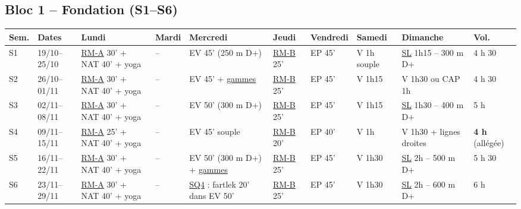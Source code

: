 \documentclass[10pt,a4paper]{article}
\newcommand{\rma}{\hyperlink{rm-a}{RM-A}}
\newcommand{\rmb}{\hyperlink{rm-b}{RM-B}}
\newcommand{\sqd}{\hyperlink{sq4}{SQ4}}
\newcommand{\gam}{\hyperlink{gammes}{gammes}}
\newcommand{\sln}{\hyperlink{legende}{SL}}
\begin{document}
\begin{landscape}
\footnotesize
\setlength{\tabcolsep}{3pt}
\renewcommand{\arraystretch}{1.32}

\subsection*{\color{acc} Bloc 1 -- Fondation (S1--S6)}
\begin{tabular}{p{0.95cm}p{1.5cm}p{2.95cm}p{1.3cm}p{3.7cm}p{1.5cm}p{3.5cm}p{2.2cm}p{3.9cm}p{1.15cm}}
\toprule
\textbf{Sem.} & \textbf{Dates} & \textbf{Lundi} & \textbf{Mardi} & \textbf{Mercredi} & \textbf{Jeudi} & \textbf{Vendredi} & \textbf{Samedi} & \textbf{Dimanche} & \textbf{Vol.}\\
\midrule
S1 & 19/10--25/10 & \rma{} 30' + NAT 40' + yoga & -- & EV 45' (250 m D+) & \rmb{} 25' & EP 45' & V 1h souple & \sln{} 1h15 -- 300 m D+ & 4 h 30\\
S2 & 26/10--01/11 & \rma{} 30' + NAT 40' + yoga & -- & EV 45' + \gam{} & \rmb{} 25' & EP 45' & V 1h15 & V 1h30 ou CAP 1h & 4 h 30\\
S3 & 02/11--08/11 & \rma{} 30' + NAT 40' + yoga & -- & EV 50' (300 m D+) & \rmb{} 25' & EP 45' & V 1h15 & \sln{} 1h30 -- 400 m D+ & 5 h\\
S4 & 09/11--15/11 & \rma{} 25' + NAT 40' + yoga & -- & EV 45' souple & \rmb{} 20' & EP 40' & V 1h & V 1h30 + lignes droites & \textbf{4 h} (all\'eg\'ee)\\
S5 & 16/11--22/11 & \rma{} 30' + NAT 40' + yoga & -- & EV 50' (300 m D+) + \gam{} & \rmb{} 25' & EP 45' & V 1h30 & \sln{} 2h -- 500 m D+ & 5 h 30\\
S6 & 23/11--29/11 & \rma{} 30' + NAT 40' + yoga & -- & \sqd{} : fartlek 20' dans EV 50' & \rmb{} 25' & EP 45' & V 1h30 & \sln{} 2h -- 600 m D+ & 6 h\\
\bottomrule
\end{tabular}
\medskip


\end{landscape}
\end{document}
